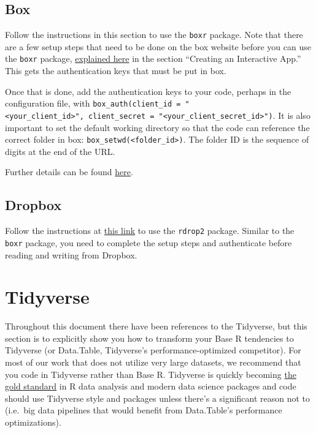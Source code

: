 \documentclass[]{book}
\begin{document}
\subsection{Box}\label{box}

Follow the instructions in this section to use the \texttt{boxr}
package. Note that there are a few setup steps that need to be done on
the box website before you can use the \texttt{boxr} package,
\href{https://r-box.github.io/boxr/articles/boxr-app-interactive.html\#create}{explained
here} in the section ``Creating an Interactive App.'' This gets the
authentication keys that must be put in box.

Once that is done, add the authentication keys to your code, perhaps in
the configuration file, with
\texttt{box\_auth(client\_id\ =\ "\textless{}your\_client\_id\textgreater{}",\ client\_secret\ =\ "\textless{}your\_client\_secret\_id\textgreater{}")}.
It is also important to set the default working directory so that the
code can reference the correct folder in box:
\texttt{box\_setwd(\textless{}folder\_id\textgreater{})}. The folder ID
is the sequence of digits at the end of the URL.

Further details can be found \href{https://github.com/r-box/boxr}{here}.

\subsection{Dropbox}\label{dropbox}

Follow the instructions at \href{https://github.com/karthik/rdrop2}{this
link} to use the \texttt{rdrop2} package. Similar to the \texttt{boxr}
package, you need to complete the setup steps and authenticate before
reading and writing from Dropbox.

\section{Tidyverse}\label{tidyverse}

Throughout this document there have been references to the Tidyverse,
but this section is to explicitly show you how to transform your Base R
tendencies to Tidyverse (or Data.Table, Tidyverse's
performance-optimized competitor). For most of our work that does not
utilize very large datasets, we recommend that you code in Tidyverse
rather than Base R. Tidyverse is quickly becoming
\href{https://rviews.rstudio.com/2017/06/08/what-is-the-tidyverse/}{the
gold standard} in R data analysis and modern data science packages and
code should use Tidyverse style and packages unless there's a
significant reason not to (i.e.~big data pipelines that would benefit
from Data.Table's performance optimizations).
\end{document}
